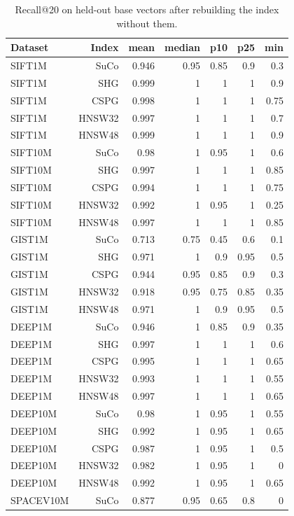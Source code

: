 \begin{table}[t]
\centering
\small
\caption{Recall@20 on held-out base vectors after rebuilding the index without them.}
\label{tab:unseen}
\begin{tabular}{lrrrrrr}
\toprule
Dataset & Index & mean & median & p10 & p25 & min \\
\midrule
SIFT1M & SuCo & 0.946 & 0.95 & 0.85 & 0.9 & 0.3 \\
SIFT1M & SHG & 0.999 & 1 & 1 & 1 & 0.9 \\
SIFT1M & CSPG & 0.998 & 1 & 1 & 1 & 0.75 \\
SIFT1M & HNSW32 & 0.997 & 1 & 1 & 1 & 0.7 \\
SIFT1M & HNSW48 & 0.999 & 1 & 1 & 1 & 0.9 \\
SIFT10M & SuCo & 0.98 & 1 & 0.95 & 1 & 0.6 \\
SIFT10M & SHG & 0.997 & 1 & 1 & 1 & 0.85 \\
SIFT10M & CSPG & 0.994 & 1 & 1 & 1 & 0.75 \\
SIFT10M & HNSW32 & 0.992 & 1 & 0.95 & 1 & 0.25 \\
SIFT10M & HNSW48 & 0.997 & 1 & 1 & 1 & 0.85 \\
GIST1M & SuCo & 0.713 & 0.75 & 0.45 & 0.6 & 0.1 \\
GIST1M & SHG & 0.971 & 1 & 0.9 & 0.95 & 0.5 \\
GIST1M & CSPG & 0.944 & 0.95 & 0.85 & 0.9 & 0.3 \\
GIST1M & HNSW32 & 0.918 & 0.95 & 0.75 & 0.85 & 0.35 \\
GIST1M & HNSW48 & 0.971 & 1 & 0.9 & 0.95 & 0.5 \\
DEEP1M & SuCo & 0.946 & 1 & 0.85 & 0.9 & 0.35 \\
DEEP1M & SHG & 0.997 & 1 & 1 & 1 & 0.6 \\
DEEP1M & CSPG & 0.995 & 1 & 1 & 1 & 0.65 \\
DEEP1M & HNSW32 & 0.993 & 1 & 1 & 1 & 0.55 \\
DEEP1M & HNSW48 & 0.997 & 1 & 1 & 1 & 0.65 \\
DEEP10M & SuCo & 0.98 & 1 & 0.95 & 1 & 0.55 \\
DEEP10M & SHG & 0.992 & 1 & 0.95 & 1 & 0.65 \\
DEEP10M & CSPG & 0.987 & 1 & 0.95 & 1 & 0.5 \\
DEEP10M & HNSW32 & 0.982 & 1 & 0.95 & 1 & 0 \\
DEEP10M & HNSW48 & 0.992 & 1 & 0.95 & 1 & 0.65 \\
SPACEV10M & SuCo & 0.877 & 0.95 & 0.65 & 0.8 & 0 \\

\end{tabular}
\end{table}
